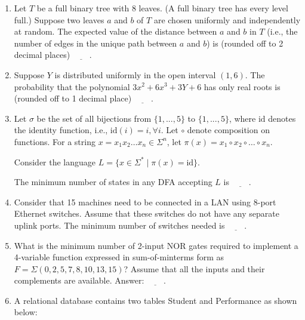 \documentclass[12pt]{article}
\begin{document}
\begin{enumerate}[label=Q.\arabic*]
\item Let $T$ be a full binary tree with 8 leaves. (A full binary tree has every level full.) Suppose two leaves $a$ and $b$ of $T$ are chosen uniformly and independently at random. The expected value of the distance between $a$ and $b$ in $T$ (i.e., the number of edges in the unique path between $a$ and $b$) is (rounded off to 2 decimal places) $\underline{\quad\quad}$.

\item Suppose $Y$ is distributed uniformly in the open interval $(1,6)$. The probability that the polynomial $3x^2 + 6x^3 + 3Y + 6$ has only real roots is (rounded off to 1 decimal place) $\underline{\quad\quad}$.

\item Let $\sigma$ be the set of all bijections from $\{1, ..., 5\}$ to $\{1, ..., 5\}$, where $\text{id}$ denotes the identity function, i.e., $\text{id}(i) = i, \forall i$. Let $\circ$ denote composition on functions. For a string $x = x_1 x_2 \dots x_n \in \Sigma^n$, let $\pi(x) = x_1 \circ x_2 \circ \dots \circ x_n$.

Consider the language $L = \{x \in \Sigma^* \mid \pi(x) = \text{id}\}$.

The minimum number of states in any DFA accepting $L$ is $\underline{\quad\quad}$.

\item Consider that 15 machines need to be connected in a LAN using 8-port Ethernet switches. Assume that these switches do not have any separate uplink ports. The minimum number of switches needed is $\underline{\quad\quad}$.

\item What is the minimum number of 2-input NOR gates required to implement a 4-variable function expressed in sum-of-minterms form as $F = \Sigma(0, 2, 5, 7, 8, 10, 13, 15)$? Assume that all the inputs and their complements are available. Answer: $\underline{\quad\quad}$.

\item A relational database contains two tables Student and Performance as shown below:


\end{enumerate}
\end{document}
